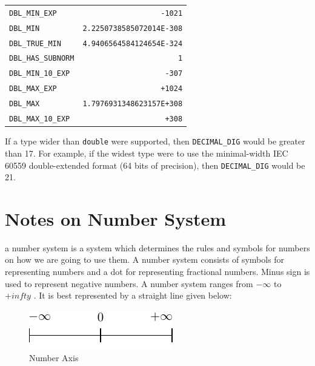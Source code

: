 {\begin{tabular}{lr}
\texttt{DBL\_MIN\_EXP}&\hfil\hspace*{3cm}\texttt{-1021}\\
\texttt{DBL\_MIN}&\hfil\hspace*{3cm}\texttt{2.2250738585072014E-308}\\
\texttt{DBL\_TRUE\_MIN}&\hfil\hspace*{3cm}\texttt{4.9406564584124654E-324}\\
\texttt{DBL\_HAS\_SUBNORM}&\hfil\hspace*{3cm}\texttt{1}\\
\texttt{DBL\_MIN\_10\_EXP}&\hfil\hspace*{3cm}\texttt{-307}\\
\texttt{DBL\_MAX\_EXP}&\hfil\hspace*{3cm}\texttt{+1024}\\
\texttt{DBL\_MAX}&\hfil\hspace*{3cm}\texttt{1.7976931348623157E+308}\\
\texttt{DBL\_MAX\_10\_EXP}&\hfil\hspace*{3cm}\texttt{+308}
\end{tabular}

If a type wider than \texttt{double} were supported, then \texttt{DECIMAL\_DIG}
would be greater than 17. For example, if the widest type were to use the
minimal-width IEC 60559 double-extended format (64 bits of precision), then
\texttt{DECIMAL\_DIG} would be 21.
}
\normalsize
\section{Notes on Number System}
a number system is a system which determines the rules and symbols for numbers
on how we are going to use them.  A number system consists of symbols for
representing numbers and a dot for representing fractional numbers. Minus sign
is used to represent negative numbers. A number system ranges from $-\infty$
to $+infty$ . It is best represented by a straight line given below:

\begin{figure}[h!]
\begin{center}
\includegraphics{figs/ns.pdf}
\end{center}
\caption{Number Axis}
\end{figure}

